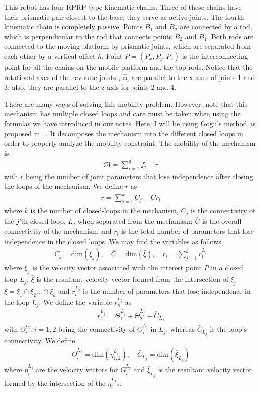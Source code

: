 \begin{solution}This robot has four RPRP-type kinematic chains. Three of these chains have their prismatic pair closest to the base; they serve as active joints. The fourth kinematic chain is completely passive. Points $B_1$ and $B_2$ are connected by a rod, which is perpendicular to the rod that connects points $B_2$ and $B_4$. Both rods are connected to the moving platform by prismatic joints, which are separated from each other by a vertical offset $h$. Point $P = (P_x,P_y, P_z)$ is the interconnecting point for all the chains on the mobile platform and the top rods. Notice that the rotational axes of the revolute joints \ie, $\bm{\hat{u}}_i$ are parallel to the x-axes of joints 1 and 3; also, they are parallel to the z-axis for joints 2 and 4. 
	
There are many ways of solving this mobility problem. However, note that this mechanism has multiple closed loops and care must be taken when using the formulas we have introduced in our notes. Here, I will be using Gogu's method as proposed in ~\cite{Gogu}. It decomposes the mechanism into the different closed loops in order to properly analyze the mobility constraint. The mobility of the mechanism is 
	\begin{align}
	\mathfrak{M} = \sum_{i=1}^{g} f_i - r
	\end{align}
	with $r$ being the number of joint parameters that lose independence after closing the loops of the mechanism. We define $r$ as 
	\begin{align}
	r = \sum_{j=1}^{k}C_j - \bar{C}  r_l
	\end{align}
	where $k$ is the number of closed-loops in the mechanism, $C_j$ is the connectivity of the $j$'th closed loop, $L_j$ when separated from  the mechanism; $\bar{C}$ is the overall connectivity of the mechanism and $r_l$ is the total number of parameters that lose independence in the closed loops. We may find the variables as follows
	\begin{align}
	C_j = \text{dim}(\xi_j), \quad \bar{C} = \text{dim} (\bar{\xi}), \quad r_l = \sum_{j=1}^{k} r_l^{L_j}
	\end{align}
	where $\xi_j$ is the velocity vector associated with the interest point $P$ in a closed loop $L_j$; $\bar{\xi}$ is the resultant velocity vector formed from the intersection of $\xi_j$ \ie $\bar{\xi} = \xi_1 \cap \xi_2 \ldots \cap \xi_k$ and $r_l^{L_j}$ is the number of parameters that lose independence in the loop $L_j$. We define the variable $r_h^{L_j}$ as 
	\begin{align}
	r_l^{L_j} = \Theta_1^{L_j} + \Theta_2^{L_j} - \bar{C}_{L_j} 
	\end{align}
	with $\Theta_i^{L_j}, i = 1,2$ being the connectivity of $G_i^{L_j}$ in $L_j$, whereas $\bar{C}_{L_j}$ is the loop's connectivity. We define
	\begin{align}
	\Theta_i^{L_j} = \text{dim} \left(\eta_{1,2}^{L_j}\right), \quad \bar{C}_{L_j} = \text{dim}\left(\bar{\xi}_{L_j}\right)
	\end{align}
	where $\eta_i^{L_j}$ are the velocity vectors for $G_i^{L_j}$ and $\bar{\xi}_{L_j}$ is the resultant velocity vector formed by the intersection of the $\eta_i^{L_j}$s.
	

\end{solution}
